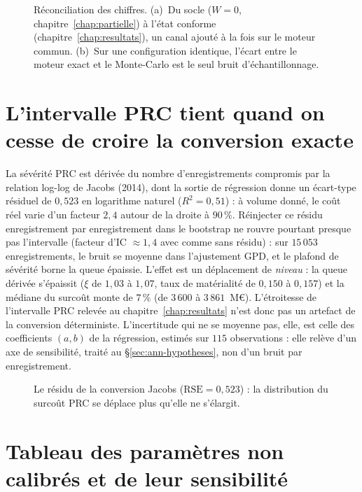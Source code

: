 \begin{figure}[htbp]\centering
{}
\caption{Réconciliation des chiffres. (a)~Du socle ($W=0$, chapitre~\ref{chap:partielle}) à
l'état conforme (chapitre~\ref{chap:resultats}), un canal ajouté à la fois sur le moteur
commun. (b)~Sur une configuration identique, l'écart entre le moteur exact et le Monte-Carlo
est le seul bruit d'échantillonnage.}
\label{fig:reconciliation}
\end{figure}

\section{L'intervalle PRC tient quand on cesse de croire la conversion exacte}
\label{sec:ann-jacobs}

La sévérité PRC est dérivée du nombre d'enregistrements compromis par la relation log-log de
Jacobs (2014), dont la sortie de régression donne un écart-type résiduel de $0{,}523$ en
logarithme naturel ($R^2 = 0{,}51$) : à volume donné, le coût réel varie d'un facteur $2{,}4$
autour de la droite à $90\,\%$. Réinjecter ce résidu enregistrement par enregistrement dans le
bootstrap ne rouvre pourtant presque pas l'intervalle (facteur d'IC $\approx 1{,}4$ avec comme
sans résidu) : sur $15\,053$ enregistrements, le bruit se moyenne dans l'ajustement GPD, et le
plafond de sévérité borne la queue épaissie. L'effet est un déplacement de \emph{niveau} : la
queue dérivée s'épaissit ($\xi$ de $1{,}03$ à $1{,}07$, taux de matérialité de $0{,}150$ à
$0{,}157$) et la médiane du surcoût monte de $7\,\%$ (de $3\,600$ à $3\,861$~M\euro).
L'étroitesse de l'intervalle PRC relevée au chapitre~\ref{chap:resultats} n'est donc pas un
artefact de la conversion déterministe. L'incertitude qui ne se moyenne pas, elle, est celle
des coefficients $(a,b)$ de la régression, estimés sur $115$ observations : elle relève d'un
axe de sensibilité, traité au \S\ref{sec:ann-hypotheses}, non d'un bruit par enregistrement.

\begin{figure}[htbp]\centering
{}
\caption{Le résidu de la conversion Jacobs ($\mathrm{RSE} = 0{,}523$) : la distribution du
surcoût PRC se déplace plus qu'elle ne s'élargit.}
\label{fig:jacobsresidu}
\end{figure}

\section{Tableau des paramètres non calibrés et de leur sensibilité}
\label{sec:ann-parametres}

